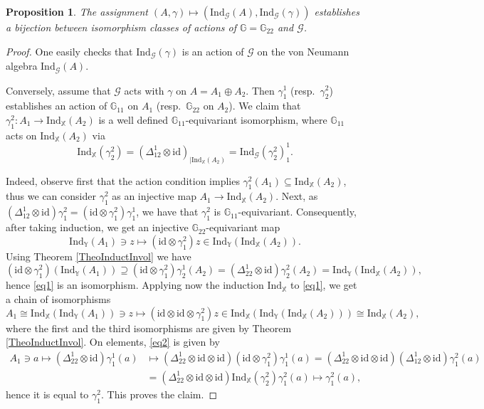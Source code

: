 \documentclass[reqno]{amsart}
\numberwithin{equation}{section}
\newtheorem{Prop}[Theorem]{Proposition}
\newcommand{\id}{\mathrm{id}}
\newcommand{\G}{\mathbb{G}}
\newcommand{\X}{\mathbb{X}}
\newcommand{\Y}{\mathbb{Y}}
\newcommand{\msG}{\mathscr{G}}
\newcommand{\Ind}{\mathrm{Ind}}
\begin{document}
\begin{Prop}
The assignment $(A,\gamma)\mapsto (\Ind_{\msG}(A),\Ind_{\msG}(\gamma))$ establishes a bijection between isomorphism classes of actions of $\G=\G_{22}$ and $\msG$.
\end{Prop}

\begin{proof}
One easily checks that $\Ind_{\msG}(\gamma)$ is an action of $\msG$ on the von Neumann algebra $\Ind_{\msG}(A)$.

Conversely, assume that $\msG$ acts with $\gamma$ on $A=A_1\oplus A_2$. Then $\gamma_1^1$ (resp.~$\gamma_2^2$) establishes an action of $\G_{11}$ on $A_1$ (resp.~$\G_{22}$ on $A_2$). We claim that $\gamma_1^2\colon A_1\rightarrow \Ind_{\X}(A_2)$ is a well defined $\G_{11}$-equivariant isomorphism, where $\G_{11}$ acts on $\Ind_{\X}(A_2)$ via 
\[
\Ind_{\X}(\gamma_2^2)=(\Delta^1_{12}\otimes\id)_{|\Ind_{\X}(A_2)}=\Ind_{\msG}(\gamma_2^2)_1^1.
\]

Indeed, observe first that the action condition implies $\gamma^2_1(A_1)\subseteq\Ind_{\X}(A_2)$, thus we can consider $\gamma^2_1$ as an injective map $A_1\rightarrow \Ind_{\X}(A_2)$. Next, as $(\Delta^1_{12}\otimes \id) \gamma^2_1 = 
(\id\otimes \gamma^2_1) \gamma^1_1$, we have that $\gamma^2_1$ is $\G_{11}$-equivariant. Consequently, after taking induction, we get an injective $\G_{22}$-equivariant map
\begin{equation}\label{eq1}
\Ind_{\Y}(A_1)\ni z \mapsto (\id\otimes \gamma^2_1)z\in 
\Ind_{\Y}(\Ind_{\X}(A_2)).
\end{equation}
 Using Theorem \ref{TheoInductInvol} we have
\[
(\id \otimes \gamma_1^2)(\Ind_{\Y}(A_1)) \supseteq (\id\otimes \gamma_1^2)\gamma_2^1(A_2) = (\Delta_{22}^1\otimes \id)\gamma_2^2(A_2) = \Ind_{\Y}(\Ind_{\X}(A_2)),
\]
hence \eqref{eq1} is an isomorphism. Applying now the induction $\Ind_{\X}$ to \eqref{eq1}, we get a chain of isomorphisms
\begin{equation}\label{eq2}
A_1\cong \Ind_{\X}(\Ind_{\Y}(A_1))\ni z\mapsto
(\id\otimes\id\otimes\gamma^2_1)z\in 
\Ind_{\X}(\Ind_{\Y}(\Ind_{\X}(A_2) ))\cong 
\Ind_{\X}(A_2),
\end{equation}
where the first and the third isomorphisms are given by Theorem \ref{TheoInductInvol}. On elements, \eqref{eq2} is given by
\[\begin{split}
A_1\ni a\mapsto (\Delta^1_{22}\otimes\id)\gamma_1^1(a)&\mapsto 
(\Delta^1_{22}\otimes\id \otimes \id)
(\id\otimes \gamma^2_1)\gamma_1^1(a)=
(\Delta^1_{22}\otimes\id \otimes \id)
(\Delta^1_{12}\otimes \id)\gamma_1^2(a)\\
&=
(\Delta^1_{22}\otimes\id\otimes\id)
\Ind_{\X}(\gamma^2_2)\gamma^2_1(a)\mapsto
\gamma^2_1(a),
\end{split}\]
hence it is equal to $\gamma_1^2$. This proves the claim.


\end{proof}
\end{document}
